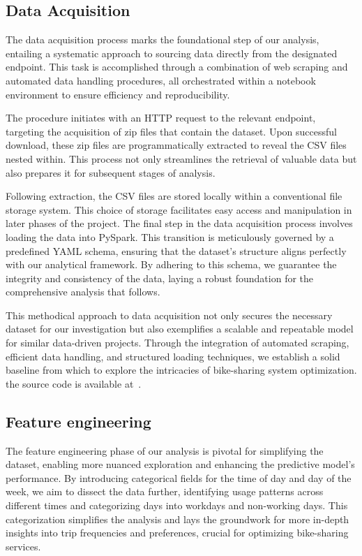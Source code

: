     \subsection{Data Acquisition}\label{subsec:data-acquisition}

    The data acquisition process marks the foundational step of our analysis, entailing a systematic approach to sourcing data directly from the designated endpoint.
    This task is accomplished through a combination of web scraping and automated data handling procedures, all orchestrated within a notebook environment to ensure efficiency and reproducibility.

    The procedure initiates with an HTTP request to the relevant endpoint, targeting the acquisition of zip files that contain the dataset.
    Upon successful download, these zip files are programmatically extracted to reveal the CSV files nested within.
    This process not only streamlines the retrieval of valuable data but also prepares it for subsequent stages of analysis.

    Following extraction, the CSV files are stored locally within a conventional file storage system.
    This choice of storage facilitates easy access and manipulation in later phases of the project.
    The final step in the data acquisition process involves loading the data into PySpark.
    This transition is meticulously governed by a predefined YAML schema, ensuring that the dataset's structure aligns perfectly with our analytical framework.
    By adhering to this schema, we guarantee the integrity and consistency of the data, laying a robust foundation for the comprehensive analysis that follows.

    This methodical approach to data acquisition not only secures the necessary dataset for our investigation but also exemplifies a scalable and repeatable model for similar data-driven projects.
    Through the integration of automated scraping, efficient data handling, and structured loading techniques, we establish a solid baseline from which to explore the intricacies of bike-sharing system optimization.
    the source code is available at~\cite{TechProjectSourceCode}.

    \subsection{Feature engineering}\label{subsec:feature-engineering}

        The feature engineering phase of our analysis is pivotal for simplifying the dataset, enabling more nuanced exploration and enhancing the predictive model's performance.
        By introducing categorical fields for the time of day and day of the week, we aim to dissect the data further, identifying usage patterns across different times and categorizing days into workdays and non-working days.
        This categorization simplifies the analysis and lays the groundwork for more in-depth insights into trip frequencies and preferences, crucial for optimizing bike-sharing services.\newline

